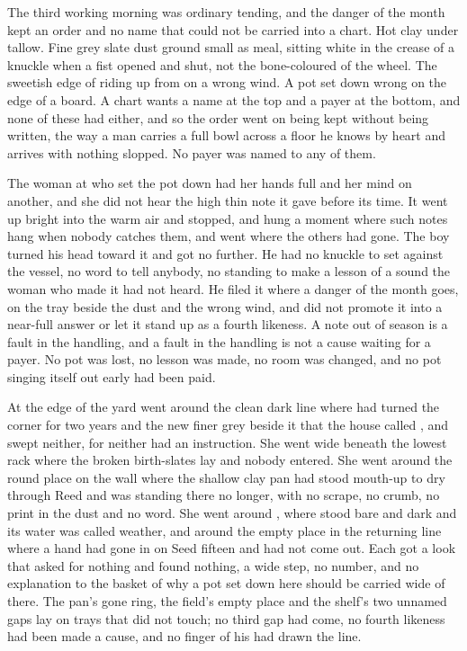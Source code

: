 \scenebreak

The third working morning was ordinary tending, and the danger of the month kept an order and no name that could not be carried into a chart. Hot clay under tallow. Fine grey slate dust ground small as meal, sitting white in the crease of a knuckle when a fist opened and shut, not the bone-coloured  of the wheel. The sweetish edge of  riding up from  on a wrong wind. A pot set down wrong on the edge of a board. A chart wants a name at the top and a payer at the bottom, and none of these had either, and so the order went on being kept without being written, the way a man carries a full bowl across a floor he knows by heart and arrives with nothing slopped. No payer was named to any of them.

The woman at  who set the pot down had her hands full and her mind on another, and she did not hear the high thin note it gave before its time. It went up bright into the warm air and stopped, and hung a moment where such notes hang when nobody catches them, and went where the others had gone. The boy turned his head toward it and got no further. He had no knuckle to set against the vessel, no word to tell anybody, no standing to make a lesson of a sound the woman who made it had not heard. He filed it where a danger of the month goes, on the tray beside the dust and the wrong wind, and did not promote it into a near-full answer or let it stand up as a fourth likeness. A note out of season is a fault in the handling, and a fault in the handling is not a cause waiting for a payer. No pot was lost, no lesson was made, no room was changed, and no pot singing itself out early had been paid.

At the edge of the yard  went around the clean dark line where  had turned the corner for two years and the new finer grey beside it that the house called , and swept neither, for neither had an instruction. She went wide beneath the lowest rack where the broken birth-slates lay and nobody entered. She went around the round place on the wall where the shallow clay pan had stood mouth-up to dry through Reed and was standing there no longer, with no scrape, no crumb, no print in the dust and no word. She went around , where  stood bare and dark and its water was called weather, and around the empty place in the returning line where a hand had gone in on Seed fifteen and had not come out. Each got a look that asked for nothing and found nothing, a wide step, no number, and no explanation to the basket of why a pot set down here should be carried wide of there. The pan's gone ring, the field's empty place and the shelf's two unnamed gaps lay on trays that did not touch; no third gap had come, no fourth likeness had been made a cause, and no finger of his had drawn the line.

